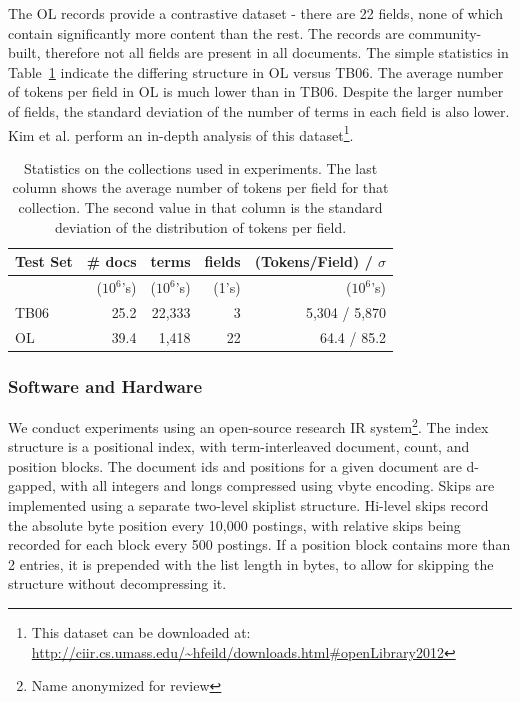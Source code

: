 \documentclass{sig-alternate}
\begin{document}
The OL records provide a contrastive dataset - there are 22 fields, none of which contain significantly more content than the rest. The records are community-built, therefore not all fields are present in all documents. The simple statistics in Table~\ref{tab:collection-stats} indicate the differing structure in OL versus TB06. The average number of tokens per field in OL is much lower than in TB06. Despite the larger number of fields, the standard deviation of the number of terms in each field is also lower. Kim et al. \cite{kim-cikm-2012} perform an in-depth analysis of this dataset\footnote{This dataset can be downloaded at: \url{http://ciir.cs.umass.edu/~hfeild/downloads.html#openLibrary2012}}.
\begin{table}
\centering
\begin{tabular}{|l|r|r|r|r|} \hline
Test Set 	& \# docs 	& terms 		& fields		&  \small{(Tokens/Field)} /  $\sigma$ \\ \hline
		& ($10^6$'s)	& ($10^6$'s)	& 	(1's)		&	($10^6$'s)	\\ \hline
TB06	& 25.2		&  22,333		& 	3		& 	5,304 / 5,870	\\ \hline
OL		& 39.4 		&  1,418		& 	22	 	& 	 64.4 / 85.2	\\ \hline
\end{tabular}
\caption{Statistics on the collections used in experiments. The last column shows the average number of tokens per field for that collection. The second value in that column is the standard deviation of the distribution of tokens per field.}
\label{tab:collection-stats}
\end{table}

\subsubsection*{Software and Hardware}
We conduct experiments using an open-source research IR system\footnote{Name anonymized for review}. The index structure is a positional index, with term-interleaved document, count, and position blocks. The document ids and positions for a given document are d-gapped, with all integers and longs compressed using vbyte encoding. Skips are implemented using a separate two-level skiplist structure. Hi-level skips record the absolute byte position every 10,000 postings, with relative skips being recorded for each block every 500 postings. If a position block contains more than 2 entries, it is prepended with the list length in bytes, to allow for skipping the structure without decompressing it.
\end{document}
